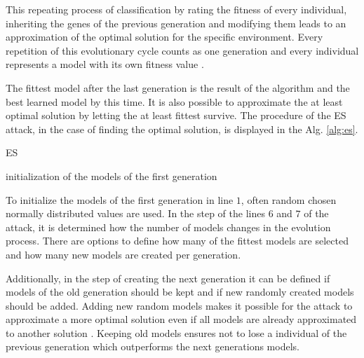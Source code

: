This repeating process of classification by rating the fitness of every individual, inheriting the genes of the previous generation and modifying them leads to an approximation of the optimal solution for the specific environment.
Every repetition of this evolutionary cycle counts as one generation and every individual represents a model with its own fitness value	\cite{Becker2015ThePUFs}. %

The fittest model after the last generation is the result of the algorithm and the best learned model by this time.
It is also possible to approximate the at least optimal solution by letting the at least fittest survive. %
The procedure of the \ac{ES} attack, in the case of finding the optimal solution, is displayed in the Alg. \ref{alg:es}.

\SetAlCapHSkip{0.2em}
\begin{algorithm}[H] %
\Indm
\SetAlgoLined
\caption{\acl{ES}}
\label{alg:es}
\Indp

initialization of the models of the first generation\\
\end{algorithm}

To initialize the models of the first generation in line $1$, often random chosen normally distributed values are used.
In the step of the lines $6$ and $7$ of the attack, it is determined how the number of models changes in the evolution process. %
There are options to define how many of the fittest models are selected and how many new models are created per generation.

Additionally, in the step of creating the next generation it can be defined if models of the old generation should be kept and if new randomly created models should be added. %
Adding new random models makes it possible for the attack to approximate a more optimal solution even if all models are already approximated to another solution \cite{2016EvolutionStrategy}.
Keeping old models ensures not to lose a individual of the previous generation which outperforms the next generations models.

